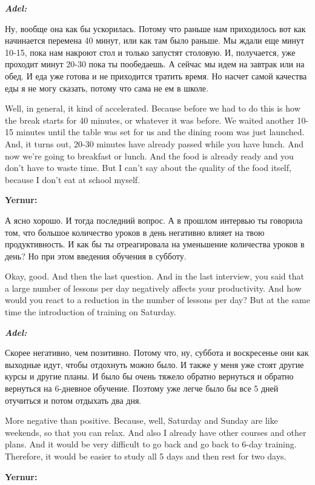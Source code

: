 \textbf{\textit{Adel:}}

Ну, вообще она как бы ускорилась. Потому что раньше нам приходилось вот как начинается перемена 40 минут, или как там было раньше. Мы ждали еще минут 10-15, пока нам накроют стол и только запустят столовую. И, получается, уже проходит минут 20-30 пока ты пообедаешь. А сейчас мы идем на завтрак или на обед. И еда уже готова и не приходится тратить время. Но насчет самой качества еды я не могу сказать, потому что сама не ем в школе.

Well, in general, it kind of accelerated. Because before we had to do this is how the break starts for 40 minutes, or whatever it was before. We waited another 10-15 minutes until the table was set for us and the dining room was just launched. And, it turns out, 20-30 minutes have already passed while you have lunch. And now we're going to breakfast or lunch. And the food is already ready and you don't have to waste time. But I can't say about the quality of the food itself, because I don't eat at school myself.

\textbf{Yernur:}

А ясно хорошо. И тогда последний вопрос. А в прошлом интервью ты говорила том, что большое количество уроков в день негативно влияет на твою продуктивность. И как бы ты отреагировала на уменьшение количества уроков в день? Но при этом введения обучения в субботу.

Okay, good. And then the last question. And in the last interview, you said that a large number of lessons per day negatively affects your productivity. And how would you react to a reduction in the number of lessons per day? But at the same time the introduction of training on Saturday.

\textbf{\textit{Adel:}}

Скорее негативно, чем позитивно. Потому что, ну, суббота и воскресенье они как выходные идут, чтобы отдохнуть можно было. И также у меня уже стоят другие курсы и другие планы. И было бы очень тяжело обратно вернуться и обратно вернуться на 6-дневное обучение. Поэтому уже легче было бы все 5 дней отучиться и потом отдыхать два дня.

More negative than positive. Because, well, Saturday and Sunday are like weekends, so that you can relax. And also I already have other courses and other plans. And it would be very difficult to go back and go back to 6-day training. Therefore, it would be easier to study all 5 days and then rest for two days.

\textbf{Yernur:}

